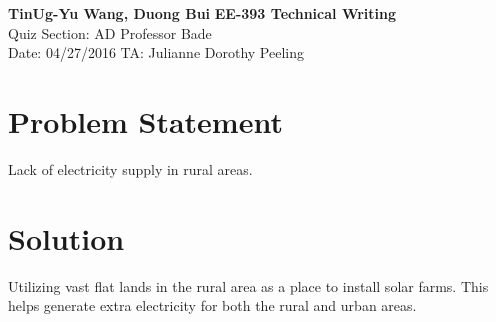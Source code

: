 \documentclass[letterpaper, 11pt]{article}
\begin{document}
\noindent
\large\textbf{TinUg-Yu Wang, Duong Bui} \hfill \textbf{EE-393 Technical Writing} \\
\normalsize Quiz Section: AD \hfill Professor Bade \\
Date: 04/27/2016 \hfill TA: Julianne Dorothy Peeling \\

\section*{}

\section*{Problem Statement}
Lack of electricity supply in rural areas.

\section*{Solution}
Utilizing vast flat lands in the rural area as a place to install solar farms. This helps generate extra electricity for both the rural and urban areas.
\end{document}
